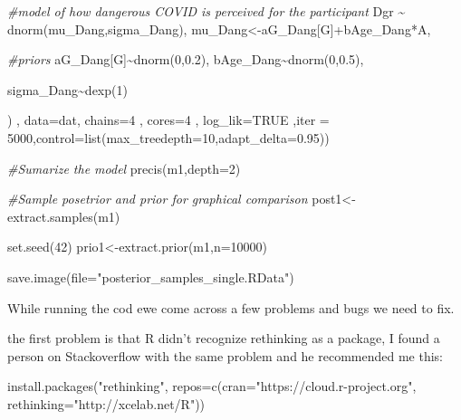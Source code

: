 \documentclass[
]{book}
\newenvironment{Shaded}{\begin{snugshade}}{\end{snugshade}}
\newcommand{\AttributeTok}[1]{\textcolor[rgb]{0.77,0.63,0.00}{#1}}
\newcommand{\CommentTok}[1]{\textcolor[rgb]{0.56,0.35,0.01}{\textit{#1}}}
\newcommand{\ConstantTok}[1]{\textcolor[rgb]{0.00,0.00,0.00}{#1}}
\newcommand{\DecValTok}[1]{\textcolor[rgb]{0.00,0.00,0.81}{#1}}
\newcommand{\FloatTok}[1]{\textcolor[rgb]{0.00,0.00,0.81}{#1}}
\newcommand{\FunctionTok}[1]{\textcolor[rgb]{0.00,0.00,0.00}{#1}}
\newcommand{\NormalTok}[1]{#1}
\newcommand{\OtherTok}[1]{\textcolor[rgb]{0.56,0.35,0.01}{#1}}
\newcommand{\SpecialCharTok}[1]{\textcolor[rgb]{0.00,0.00,0.00}{#1}}
\newcommand{\StringTok}[1]{\textcolor[rgb]{0.31,0.60,0.02}{#1}}
\begin{document}
\begin{Shaded}
\begin{Highlighting}[]
    \CommentTok{\#model of how dangerous COVID is perceived for the participant}
\NormalTok{    Dgr }\SpecialCharTok{\textasciitilde{}} \FunctionTok{dnorm}\NormalTok{(mu\_Dang,sigma\_Dang),}
\NormalTok{    mu\_Dang}\OtherTok{\textless{}{-}}\NormalTok{aG\_Dang[G]}\SpecialCharTok{+}\NormalTok{bAge\_Dang}\SpecialCharTok{*}\NormalTok{A,}
    
    \CommentTok{\#priors}
\NormalTok{    aG\_Dang[G]}\SpecialCharTok{\textasciitilde{}}\FunctionTok{dnorm}\NormalTok{(}\DecValTok{0}\NormalTok{,}\FloatTok{0.2}\NormalTok{),}
\NormalTok{    bAge\_Dang}\SpecialCharTok{\textasciitilde{}}\FunctionTok{dnorm}\NormalTok{(}\DecValTok{0}\NormalTok{,}\FloatTok{0.5}\NormalTok{),}
    
\NormalTok{    sigma\_Dang}\SpecialCharTok{\textasciitilde{}}\FunctionTok{dexp}\NormalTok{(}\DecValTok{1}\NormalTok{)}
    
\NormalTok{    ) , }\AttributeTok{data=}\NormalTok{dat, }\AttributeTok{chains=}\DecValTok{4}\NormalTok{ , }\AttributeTok{cores=}\DecValTok{4}\NormalTok{ , }\AttributeTok{log\_lik=}\ConstantTok{TRUE}\NormalTok{ ,}\AttributeTok{iter =} \DecValTok{5000}\NormalTok{,}\AttributeTok{control=}\FunctionTok{list}\NormalTok{(}\AttributeTok{max\_treedepth=}\DecValTok{10}\NormalTok{,}\AttributeTok{adapt\_delta=}\FloatTok{0.95}\NormalTok{))}

\CommentTok{\#Sumarize the model}
\FunctionTok{precis}\NormalTok{(m1,}\AttributeTok{depth=}\DecValTok{2}\NormalTok{)}

\CommentTok{\#Sample posetrior and prior for graphical comparison}
\NormalTok{post1}\OtherTok{\textless{}{-}}\FunctionTok{extract.samples}\NormalTok{(m1)}

\FunctionTok{set.seed}\NormalTok{(}\DecValTok{42}\NormalTok{)}
\NormalTok{prio1}\OtherTok{\textless{}{-}}\FunctionTok{extract.prior}\NormalTok{(m1,}\AttributeTok{n=}\DecValTok{10000}\NormalTok{)}

\FunctionTok{save.image}\NormalTok{(}\AttributeTok{file=}\StringTok{"posterior\_samples\_single.RData"}\NormalTok{)}
\end{Highlighting}
\end{Shaded}

While running the cod ewe come across a few problems and bugs we need to fix.

the first problem is that R didn't recognize rethinking as a package, I found a person on Stackoverflow with the same problem and he recommended me this:

\begin{Shaded}
\begin{Highlighting}[]
\FunctionTok{install.packages}\NormalTok{(}\StringTok{"rethinking"}\NormalTok{, }
                 \AttributeTok{repos=}\FunctionTok{c}\NormalTok{(}\AttributeTok{cran=}\StringTok{"https://cloud.r{-}project.org"}\NormalTok{,}
                         \AttributeTok{rethinking=}\StringTok{"http://xcelab.net/R"}\NormalTok{))}
\end{Highlighting}
\end{Shaded}
\end{document}
